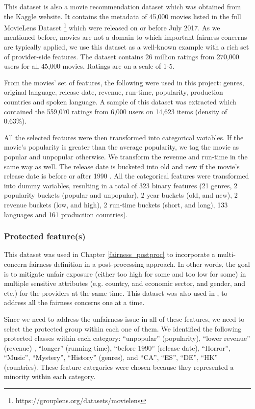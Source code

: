     This dataset is also a movie recommendation dataset which was obtained from the Kaggle website. It contains the metadata of 45,000 movies listed in the full MovieLens Dataset \footnote{https://grouplens.org/datasets/movielens} which were released on or before July 2017. As we mentioned before, movies are not a domain to which important fairness concerns are typically applied, we use this dataset as a well-known example with a rich set of provider-side features. The dataset contains 26 million ratings from 270,000 users for all 45,000 movies. Ratings are on a scale of 1-5.
    
    From the movies' set of features, the following were used in this project: genres, original language, release date, revenue, run-time, popularity, production countries and spoken language. A sample of this dataset was extracted which contained the 559,070 ratings from 6,000 users on 14,623 items (density of 0.63\%).

    All the selected features were then transformed into categorical variables. If the movie's popularity is greater than the average popularity, we tag the movie as popular and unpopular otherwise. We transform the revenue and run-time in the same way as well. The release date is bucketed into old and new if the movie's release date is before or after 1990 \cite{kamishima2016model}. All the categorical features were transformed into dummy variables, resulting in a total of 323 binary features (21 genres, 2 popularity buckets (popular and unpopular), 2 year buckets (old, and new), 2 revenue buckets (low, and high), 2 run-time buckets (short, and long), 133 languages and 161 production countries).
    
        \subsubsection{Protected feature(s)}

        This dataset was used in Chapter \ref{fairness_postproc}  to incorporate a multi-concern fairness definition in a post-processing approach. In other words, the goal is to mitigate unfair exposure (either too high for some and too low for some) in multiple sensitive attributes (e.g. country, and economic sector, and gender, and etc.) for the providers at the same time. This dataset was also used in , to address all the fairness concerns one at a time.
    
        Since we need to address the unfairness issue in all of these features, we need to select the protected group within each one of them.
        We identified the following protected classes within each category: ``unpopular'' (popularity), ``lower revenue'' (revenue) , ``longer'' (running time), ``before 1990'' (release date), ``Horror'', ``Music'', ``Mystery'', ``History'' (genres), and ``CA'', ``ES'', ``DE'', ``HK'' (countries). These feature categories were chosen because they represented a minority within each category.
    
